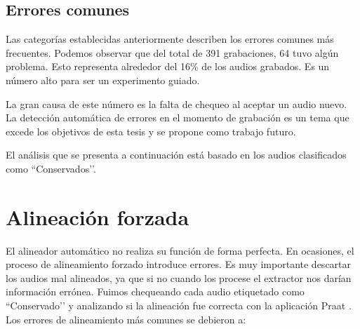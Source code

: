 \subsection{Errores comunes}

Las categorías establecidas anteriormente describen los errores comunes más frecuentes. Podemos observar que del total de 391 grabaciones, 64 tuvo algún problema. Esto representa alrededor del 16\% de los audios grabados. Es un número alto para ser un experimento guiado.

La gran causa de este número es la falta de chequeo al aceptar un audio nuevo. La detección automática de errores en el momento de grabación es un tema que excede los objetivos de esta tesis y se propone como trabajo futuro.

El análisis que se presenta a continuación está basado en los audios clasificados como ``Conservados’’.

\section{Alineación forzada}

El alineador automático no realiza su función de forma perfecta. En ocasiones, el proceso de alineamiento forzado introduce errores. Es muy importante descartar los audios mal alineados, ya que si no cuando los procese el extractor nos darían información errónea. Fuimos chequeando cada audio etiquetado como ``Conservado’’ y analizando si la alineación fue correcta con la aplicación Praat \cite{praat}. Los errores de alineamiento más comunes se debieron a:


